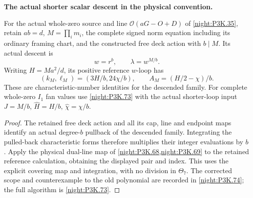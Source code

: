 \begin{proposition}\label{iv:correction:P3K.35}
\textbf{The actual shorter scalar descent in the physical convention.}\par
For the actual whole-zero source and line
\(\mathcal O(aG-O+D)\) of \cref{night:P3K.35}, retain
\(ab=d\), \(M=\prod_i m_i\), the complete signed norm
equation including its ordinary framing chart, and the constructed
free deck action with \(b\mid M\). Its actual descent is
\[
 w=r^b,\qquad \lambda=w^{M/b}.
\]
Writing \(H=Ma^2/d\), its positive reference \(w\)-loop has
\[
 (k_M,\ell_M)=(3H/b,24\chi/b),\qquad
 A_M=(H/2-\chi)/b.
\]
These are characteristic-number identities for the descended
family. For complete whole-zero \(I_1\) fan values use
\cref{night:P3K.73} with the actual shorter-loop input
\(J=M/b\), \(\widehat H=H/b\), \(\widehat\chi=\chi/b\).
\end{proposition}
\begin{proof}
The retained free deck action and all its cap, line and
endpoint maps identify an actual degree-\(b\) pullback of the
descended family. Integrating the pulled-back characteristic forms
therefore multiplies their integer evaluations by \(b\).
Apply the physical dual-line map of
\cref{night:P3K.68,night:P3K.69} to the retained reference
calculation, obtaining the displayed pair and index. This uses
the explicit covering map and integration, with no division in
\(\Theta_7\). The corrected scope and counterexample to the old
polynomial are recorded in \cref{night:P3K.74}; the full algorithm
is \cref{night:P3K.73}.
\end{proof}



